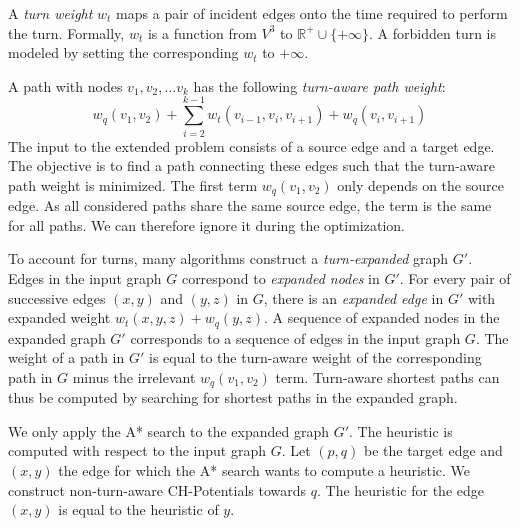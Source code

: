 \documentclass[letterpaper]{article} %
\begin{document}
A \emph{turn weight} $w_t$ maps a pair of incident edges onto the time required to perform the turn.
Formally, $w_t$ is a function from $V^3$ to $\mathbb{R}^+ \cup \{+\infty\}$.
A forbidden turn is modeled by setting the corresponding $w_t$ to $+\infty$.

A path with nodes $v_1, v_2,\ldots v_k$ has the following \emph{turn-aware path weight}:\[
w_q(v_1, v_2) + \sum_{i=2}^{k-1}  w_t(v_{i-1},v_i,v_{i+1})  + w_q(v_i,v_{i+1})
\] The input to the extended problem consists of a source edge and a target edge.
The objective is to find a path connecting these edges such that the turn-aware path weight is minimized.
The first term $w_q(v_1, v_2)$ only depends on the source edge.
As all considered paths share the same source edge, the term is the same for all paths.
We can therefore ignore it during the optimization.

To account for turns, many algorithms construct a \emph{turn-expanded} graph $G'$.
Edges in the input graph $G$ correspond to \emph{expanded nodes} in $G'$.
For every pair of successive edges $(x,y)$ and $(y,z)$ in $G$, there is an \emph{expanded edge} in $G'$ with expanded weight $w_t(x,y,z) + w_q(y,z)$.
A sequence of expanded nodes in the expanded graph $G'$ corresponds to a sequence of edges in the input graph $G$.
The weight of a path in $G'$ is equal to the turn-aware weight of the corresponding path in $G$ minus the irrelevant $w_q(v_1,v_2)$ term.
Turn-aware shortest paths can thus be computed by searching for shortest paths in the expanded graph.


We only apply the A* search to the expanded graph $G'$.
The heuristic is computed with respect to the input graph $G$.
Let $(p,q)$ be the target edge and $(x,y)$ the edge for which the A* search wants to compute a heuristic.
We construct non-turn-aware CH-Potentials towards $q$.
The heuristic for the edge $(x,y)$ is equal to the heuristic of $y$.
\end{document}

